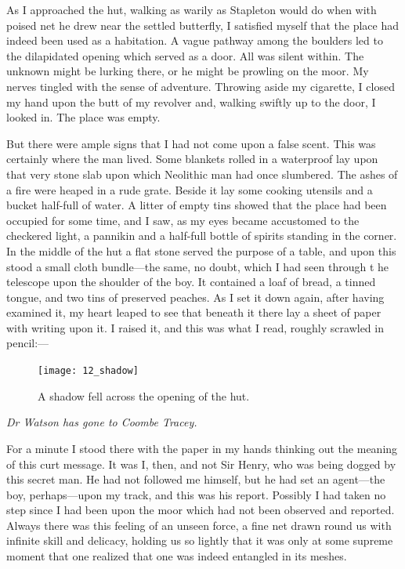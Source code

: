 \documentclass[paper=a5,BCOR=7mm,twoside,DIV=calc,12pt,usegeometry,openany,chapterprefix,endperiod,headings=big]{scrbook} %
\begin{document}
As I approached the hut, walking as warily as Stapleton would do when with poised net he drew near the settled butterfly, I satisfied myself that the place had indeed been used as a habitation. A vague pathway among the boulders led to the dilapidated opening which served as a door. All was silent within. The unknown might be lurking there, or he might be prowling on the moor. My nerves tingled with the sense of adventure. Throwing aside my cigarette, I closed my hand upon the butt of my revolver and, walking swiftly up to the door, I looked in. The place was empty.

But there were ample signs that I had not come upon a false scent. This was certainly where the man lived. Some blankets rolled in a waterproof lay upon that very stone slab upon which Neolithic man had once slumbered. The ashes of a fire were heaped in a rude grate. Beside it lay some cooking utensils and a bucket half-full of water. A litter of empty tins showed that the place had been occupied for some time, and I saw, as my eyes became accustomed to the checkered light, a pannikin and a half-full bottle of spirits standing in the corner. In the middle of the hut a flat stone served the purpose of a table, and upon this stood a small cloth bundle---the same, no doubt, which I had seen through t
he telescope upon the shoulder of the boy. It contained a loaf of bread, a tinned tongue, and two tins of preserved peaches. As I set it down again, after having examined it, my heart leaped to see that beneath it there lay a sheet of paper with writing upon it. I raised it, and this was what I read, roughly scrawled in pencil:--- 

\begin{figure}[p]
\centering
\texttt{[image: 12\_shadow]}
\caption{A shadow fell across the opening of the hut.}
\end{figure}

\textit{Dr Watson has gone to Coombe Tracey.}

For a minute I stood there with the paper in my hands thinking out the meaning of this curt message. It was I, then, and not Sir Henry, who was being dogged by this secret man. He had not followed me himself, but he had set an agent---the boy, perhaps---upon my track, and this was his report. Possibly I had taken no step since I had been upon the moor which had not been observed and reported. Always there was this feeling of an unseen force, a fine net drawn round us with infinite skill and delicacy, holding us so lightly that it was only at some supreme moment that one realized that one was indeed entangled in its meshes.
\end{document}
